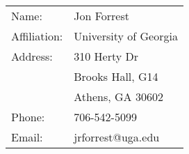 
\begin{tabular}{l l}
  Name:        & Jon Forrest \\
  Affiliation: & University of Georgia \\
  Address:     & 310 Herty Dr \\
               & Brooks Hall, G14 \\
               & Athens, GA 30602 \\
  Phone:       & 706-542-5099 \\
  Email:       & jrforrest@uga.edu
\end{tabular}
